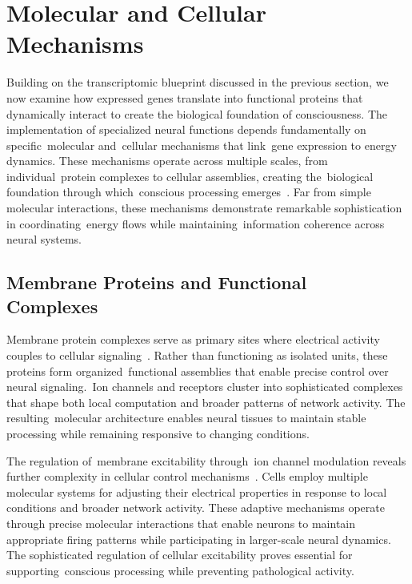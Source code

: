 \section{Molecular and Cellular Mechanisms~~}

Building on the transcriptomic blueprint discussed in the previous section, we now examine how expressed genes translate into functional proteins that dynamically interact to create the biological foundation of consciousness. The implementation of specialized neural functions depends fundamentally on specific~molecular and~cellular mechanisms that link~gene expression to energy dynamics. These mechanisms operate across multiple scales, from individual~protein complexes to cellular assemblies, creating the~biological foundation through which~conscious processing emerges~\cite{Baluska2016, Balchin2016}. Far from simple molecular interactions, these mechanisms demonstrate remarkable sophistication in coordinating~energy flows while maintaining~information coherence across neural systems.

\subsection*{Membrane Proteins and Functional Complexes~}

Membrane protein complexes serve as primary sites where electrical activity couples to cellular signaling~\cite{Barker2018, Andersen1992}. Rather than functioning as isolated units, these proteins form organized~functional assemblies that enable precise control over neural signaling.~Ion channels and receptors cluster into sophisticated complexes that shape both local computation and broader patterns of network activity. The resulting~molecular architecture enables neural tissues to maintain stable processing while remaining responsive to changing conditions.

The regulation of~membrane excitability through~ion channel modulation reveals further complexity in cellular control mechanisms~\cite{Marder2012, Bezanilla2002}. Cells employ multiple molecular systems for adjusting their electrical properties in response to local conditions and broader network activity. These adaptive mechanisms operate through precise molecular interactions that enable neurons to maintain appropriate firing patterns while participating in larger-scale neural dynamics. The sophisticated regulation of cellular excitability proves essential for supporting~conscious processing while preventing pathological activity.


